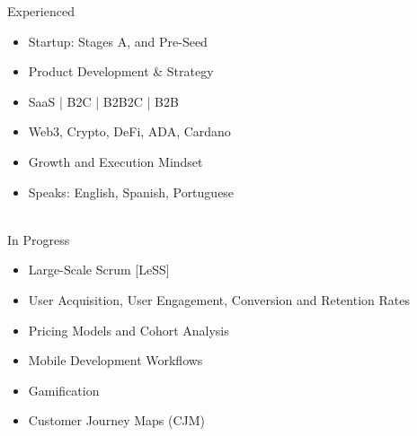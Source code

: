 %
Experienced
  \begin{itemize}
    \setlength\itemsep{-0.3em}
\item Startup: Stages A, and Pre-Seed
\item Product Development \& Strategy
\item SaaS | B2C | B2B2C | B2B
\item Web3, Crypto, DeFi, ADA, Cardano
\item Growth and Execution Mindset
\item Speaks: English, Spanish, Portuguese
    \end{itemize}
\\
%
In Progress %
  \begin{itemize}
    \setlength\itemsep{-0.3em}
\item Large-Scale Scrum [LeSS]
\item User Acquisition, User Engagement, %
Conversion and Retention Rates %
\item Pricing Models and Cohort Analysis
\item Mobile Development Workflows
\item Gamification
\item Customer Journey Maps (CJM)
\end{itemize}

